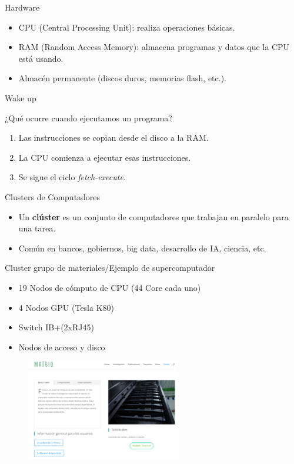 \documentclass[10pt]{beamer}
\begin{document}
\begin{frame}{Hardware}
	\begin{itemize}\small
		\item CPU (Central Processing Unit): realiza operaciones b\'asicas.
		\item RAM (Random Access Memory): almacena programas y datos que la CPU est\'a usando.
		\item Almac\'en permanente (discos duros, memorias flash, etc.).
	\end{itemize}
\end{frame}

\begin{frame}{Wake up}
    \begin{block}{¿Qu\'e ocurre cuando ejecutamos un programa?}
		\begin{enumerate}\small
		\item Las instrucciones se copian desde el disco a la RAM.
		\item La CPU comienza a ejecutar esas instrucciones.
		\item Se sigue el ciclo \textit{fetch-execute}.
	    \end{enumerate}
	\end{block}
\end{frame}

\begin{frame}{Clusters de Computadores}
\begin{itemize}\small
    \item Un \textbf{clúster} es un conjunto de computadores que trabajan en paralelo para una tarea.
    \item Común en bancos, gobiernos, big data, desarrollo de IA, ciencia, etc.
\end{itemize}
\end{frame}

\begin{frame}[fragile]{Cluster grupo de materiales/Ejemplo de supercomputador}
 \begin{itemize}\scriptsize
	\item 19 Nodos de cómputo de CPU (44 Core cada uno)
    \item 4 Nodos GPU (Tesla K80)
    \item Switch IB+(2xRJ45)
    \item Nodos de acceso y disco
\end{itemize}

\begin{figure}
\includegraphics[width=0.6\textwidth]{homecluster}
\end{figure}
\end{frame}
\end{document}
